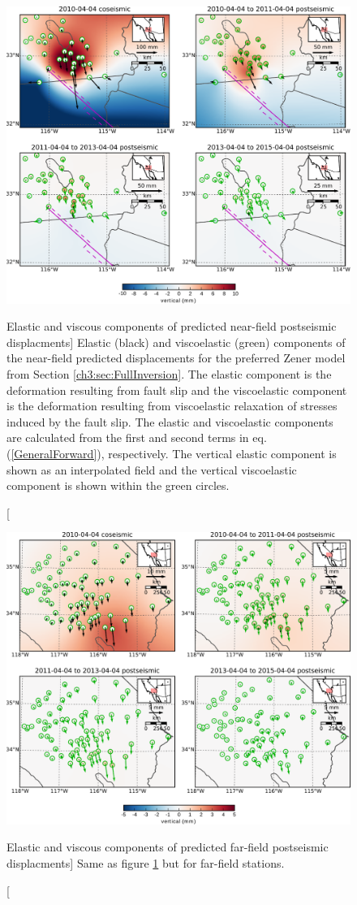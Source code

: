 \begin{figure}
\noindent\includegraphics[scale=0.9]{ch3/figures/2016jb013114-pS03}
\caption
[Elastic and viscous components of predicted near-field postseismic
displacments]
{Elastic (black) and viscoelastic (green) components of the near-field
predicted displacements for the preferred Zener model from Section
\ref{ch3:sec:FullInversion}.  The elastic component is the deformation
resulting from fault slip and the viscoelastic component is the
deformation resulting from viscoelastic relaxation of stresses induced
by the fault slip. The elastic and viscoelastic components are
calculated from the first and second terms in eq.
(\ref{GeneralForward}), respectively.  The vertical elastic
component is shown as an interpolated field and the vertical
viscoelastic component is shown within the green circles.}
\label{ch3:fig:S3}
\end{figure}

\begin{figure}
\noindent\includegraphics[scale=0.9]{ch3/figures/2016jb013114-pS04}
\caption
[Elastic and viscous components of predicted far-field postseismic
displacments]
{Same as figure \ref{ch3:fig:S3} but for far-field stations.}
\label{ch3:fig:S4}
\end{figure}

